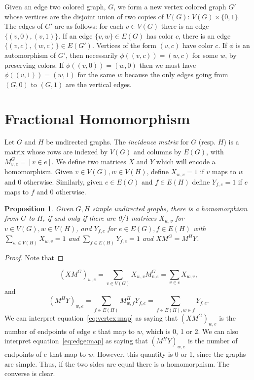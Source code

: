 \documentclass{article}
\newtheorem{proposition}{Proposition}
\begin{document}
Given an edge two colored graph, $G$, we form a new vertex colored
graph $G'$ whose vertices are the disjoint union of two copies of
$V(G)$: $V(G) \times \{0,1\}$.  The edges of $G'$ are as follows:
for each $v \in V(G)$ there is an edge $\{(v,0), (v,1)\}$.  If an edge
$\{v,w\} \in E(G)$ has color $c$, there is an edge $\{(v,c), (w,c)\}
\in E(G')$.  Vertices of the form $(v,c)$ have color $c$.  If $\phi$
is an automorphism of $G'$, then necessarily $\phi((v,c)) = (w,c)$ for
some $w$, by preserving colors.  If $\phi((v,0)) = (w,0)$ then we must
have $\phi((v,1)) = (w,1)$ for the same $w$ because the only edges
going from $(G,0)$ to $(G,1)$ are the vertical edges.

\section{Fractional Homomorphism}
\label{sec:fractional}

Let $G$ and $H$ be undirected graphs.  The \emph{incidence matrix} for
$G$ (resp. $H$) is a matrix whose rows are indexed by $V(G)$ and
columns by $E(G)$, with $M_{v,e}^G = [v \in e]$.  We define two
matrices $X$ and $Y$ which will encode a homomorphism.  Given $v \in
V(G), w \in V(H)$, define $X_{w,v} = 1$ if $v$ maps to $w$ and 0
otherwise.  Similarly, given $e \in E(G)$ and $f \in E(H)$ define
$Y_{f,e} = 1$ if $e$ maps to $f$ and 0 otherwise.
\begin{proposition}
  Given $G, H$ simple undirected graphs, there is a homomorphism from
  $G$ to $H$, if and only if there are 0/1 matrices $X_{w,v}$ for
  $v \in V(G), w \in V(H)$, and $Y_{f,e}$ for $e \in E(G), f \in E(H)$
  with $\sum_{w \in V(H)} X_{w,v} = 1$ and
  $\sum_{f \in E(H)} Y_{f,e} = 1$ and $X M^G = M^H Y$.
\end{proposition}
\begin{proof}
  Note that
\end{proof}
\begin{equation}
\label{eq:vertex:map}
(X M^G)_{w,e} = \sum_{v \in V(G)} X_{w,v} M^G_{v,e} = \sum_{v \in e}
X_{w,v},
\end{equation}
and
\begin{equation}
\label{eq:edge:map}
  (M^H Y)_{w, e} = \sum_{f \in E(H)} M^H_{w,f} Y_{f,e} = \sum_{f \in
    E(H), w \in f} Y_{f,e}.
\end{equation}
We can interpret equation~\eqref{eq:vertex:map} as saying that $(X
M^G)_{w,e}$ is the number of endpoints of edge $e$ that map to
$w$, which is 0, 1 or 2.  We can also interpret
equation~\eqref{eq:edge:map} as saying that $(M^H Y)_{w,e}$ is
the number of endpoints of $e$ that map to $w$.  However, this
quantity is 0 or 1, since the graphs are simple.  Thus, if the two
sides are equal there is a homomorphism.  The converse is clear.
\end{document}
